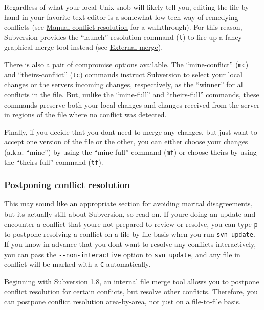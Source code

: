 Regardless of what your local Unix snob will likely tell you, editing
the file by hand in your favorite text editor is a somewhat low-tech way
of remedying conflicts (see
\hyperref[svn.tour.cycle.resolve.byhand]{Manual conflict resolution} for
a walkthrough). For this reason, Subversion provides the ``launch''
resolution command (\texttt{l}) to fire up a fancy graphical merge tool
instead (see \hyperref[svn.advanced.externaldifftools.merge]{External
merge}).

There is also a pair of compromise options available. The
``mine-conflict'' (\texttt{mc}) and ``theirs-conflict'' (\texttt{tc})
commands instruct Subversion to select your local changes or the
server\textquotesingle s incoming changes, respectively, as the
``winner'' for all conflicts in the file. But, unlike the ``mine-full''
and ``theirs-full'' commands, these commands preserve both your local
changes and changes received from the server in regions of the file
where no conflict was detected.

Finally, if you decide that you don\textquotesingle t need to merge any
changes, but just want to accept one version of the file or the other,
you can either choose your changes (a.k.a. ``mine'') by using the
``mine-full'' command (\texttt{mf}) or choose theirs by using the
``theirs-full'' command (\texttt{tf}).

\subsubsection{Postponing conflict
resolution}\label{svn.tour.cycle.resolve.pending}

This may sound like an appropriate section for avoiding marital
disagreements, but it\textquotesingle s actually still about Subversion,
so read on. If you\textquotesingle re doing an update and encounter a
conflict that you\textquotesingle re not prepared to review or resolve,
you can type \texttt{p} to postpone resolving a conflict on a
file-by-file basis when you run \texttt{svn\ update}. If you know in
advance that you don\textquotesingle t want to resolve any conflicts
interactively, you can pass the \texttt{-\/-non-interactive} option to
\texttt{svn\ update}, and any file in conflict will be marked with a
\texttt{C} automatically.

Beginning with Subversion 1.8, an internal file merge tool allows you to
postpone conflict resolution for certain conflicts, but resolve other
conflicts. Therefore, you can postpone conflict resolution area-by-area,
not just on a file-to-file basis.

